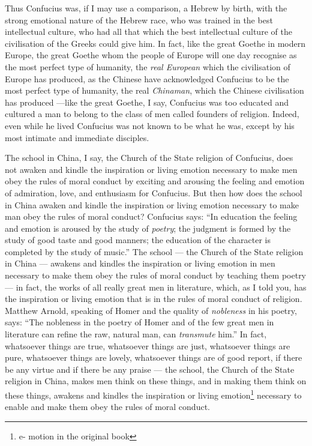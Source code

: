 Thus Confucius was, if I may use a comparison, a Hebrew by birth, with the strong emotional nature of the Hebrew race, who was trained in the best intellectual culture, who had all that which the best intellectual culture of the civilisation of the Greeks could give him.
In fact, like the great Goethe in modern Europe, the great Goethe whom the people of Europe will one day recognise as the most perfect type of humanity, the \emph{real European} which the civilisation of Europe has produced, as the Chinese have acknowledged Confucius to be the most perfect type of humanity, the real \emph{Chinaman}, which the Chinese civilisation has produced ---like the great Goethe, I say, Confucius was too educated and cultured a man to belong to the class of men called founders of religion.
Indeed, even while he lived Confucius was not known to be what he was, except by his most intimate and immediate disciples.

The school in China, I say, the Church of the State religion of Confucius, does not awaken and kindle the inspiration or living emotion necessary to make men obey the rules of moral conduct by exciting and arousing the feeling and emotion of admiration, love, and enthusiasm for Confucius.
But then how does the school in China awaken and kindle the inspiration or living emotion necessary to make man obey the rules of moral conduct?
Confucius says: ``In education the feeling and emotion is aroused by the study of \emph{poetry}; the judgment is formed by the study of good taste and good manners; the education of the character is completed by the study of music.''
The school --- the Church of the State religion in China --- awakens and kindles the inspiration or living emotion in men necessary to make them obey the rules of moral conduct by teaching them poetry --- in fact, the works of all really great men in literature, which, as I told you, has the inspiration or living emotion that is in the rules of moral conduct of religion.
Matthew Arnold, speaking of Homer and the quality of \emph{nobleness} in his poetry, says: ``The nobleness in the poetry of Homer and of the few great men in literature can refine the raw, natural man, can \emph{transmute} him.''
In fact, whatsoever things are true, whatsoever things are just, whatsoever things are pure, whatsoever things are lovely, whatsoever things are of good report, if there be any virtue and if there be any praise --- the school, the Church of the State religion in China, makes men think on these things, and in making them think on these things, awakens and kindles the inspiration or living emotion\footnote{e- motion in the original book} necessary to enable and make them obey the rules of moral conduct.

